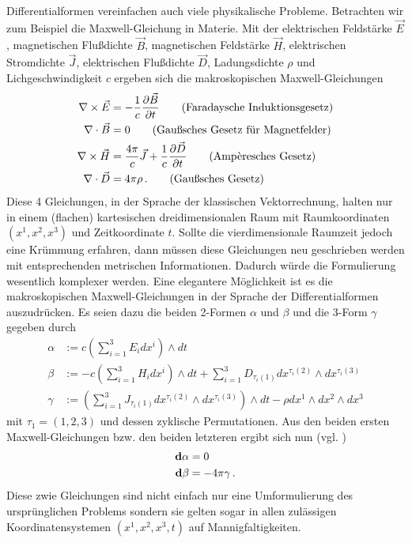 Differentialformen vereinfachen auch viele physikalische Probleme. 
Betrachten wir zum Beispiel die Maxwell-Gleichung in Materie.
Mit der elektrischen Feldstärke \( \vec{E} \), magnetischen Flußdichte \( \vec{B} \), magnetischen Feldstärke \( \vec{H} \), elektrischen Stromdichte \( \vec{J} \),
elektrischen Flußdichte \( \vec{D} \), Ladungsdichte \( \rho \) und Lichgeschwindigkeit \( c \)
ergeben sich die makroskopischen Maxwell-Gleichungen 
\begin{align}
  \nabla \times \vec{E} &= - \frac{1}{c} \frac{\partial \vec{B}}{\partial t} \tag{Faradaysche Induktionsgesetz} \\
  \nabla \cdot \vec{B} &= 0 \tag{Gaußsches Gesetz für Magnetfelder}\\
  \nabla \times \vec{H} &= \frac{4\pi}{c} \vec{J} + \frac{1}{c} \frac{\partial\vec{D}}{\partial t}  \tag{Amp\`{e}resches Gesetz}\\
  \nabla \cdot \vec{D} &= 4 \pi \rho \formpunkt \tag{Gaußsches Gesetz}
\end{align}
Diese 4 Gleichungen, in der Sprache der klassischen Vektorrechnung, halten nur in einem (flachen) kartesischen dreidimensionalen Raum mit Raumkoordinaten 
\( \left( x^{1}, x^{2}, x^{3} \right) \) und Zeitkoordinate \( t \).
Sollte die vierdimensionale Raumzeit jedoch eine Krümmung erfahren, dann müssen diese Gleichungen neu geschrieben werden mit entsprechenden metrischen Informationen.
Dadurch würde die Formulierung wesentlich komplexer werden. 
Eine elegantere Möglichkeit ist es die makroskopischen Maxwell-Gleichungen in der Sprache der Differentialformen auszudrücken. 
Es seien dazu die beiden 2-Formen \( \alpha \) und \( \beta \)
und die 3-Form \( \gamma \) gegeben durch
\begin{align}
    \alpha &:= c \left( \sum_{i=1}^{3} E_{i}dx^{i}\right) \wedge dt \\
    \beta &:=  - c \left( \sum_{i=1}^{3} H_{i}dx^{i}\right) \wedge dt
                + \sum_{i=1}^{3} D_{\tau_{i}(1)} dx^{\tau_{i}(2)}\wedge dx^{\tau_{i}(3)} \\
    \gamma &:= \left( \sum_{i=1}^{3} J_{\tau_{i}(1)} dx^{\tau_{i}(2)}\wedge dx^{\tau_{i}(3)} \right) \wedge dt
                - \rho dx^{1} \wedge dx^{2} \wedge dx^{3}
\end{align}
mit \( \tau_{1}=\left( 1,2,3 \right) \) und dessen zyklische Permutationen.
Aus den beiden ersten Maxwell-Gleichungen bzw. den beiden letzteren ergibt sich nun (vgl. \cite[4.6]{flanders})
\begin{align}
  \begin{aligned}
    \mathbf{d}\alpha &= 0 \\
    \mathbf{d}\beta  &= -4\pi\gamma  \,\text{.}
  \end{aligned}
\end{align}
Diese zwie Gleichungen sind nicht einfach nur eine Umformulierung des ursprünglichen Problems 
sondern sie gelten sogar in allen zulässigen Koordinatensystemen \( \left( x^{1}, x^{2}, x^{3}, t  \right) \) auf Mannigfaltigkeiten.

